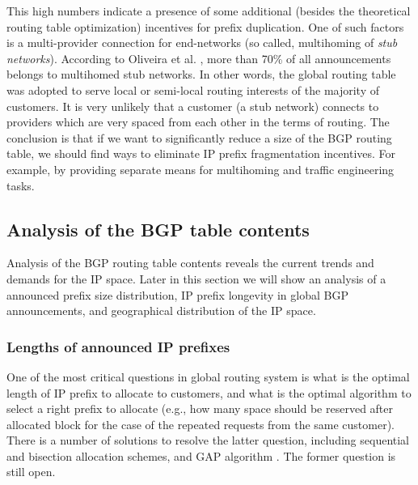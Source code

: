 This high numbers indicate a presence of some additional (besides the
theoretical routing table optimization) incentives for prefix duplication. One
of such factors is a multi-provider connection for end-networks (so called,
multihoming of \emph{stub networks}). According to Oliveira et al.
\cite{Oliveira:2007:Observing-the-evolution}, more than 70\% of all
announcements belongs to multihomed stub networks. In other words, the global
routing table was adopted to serve local or semi-local routing interests of
the majority of customers. It is very unlikely that a customer (a stub
network) connects to providers which are very spaced from each other in the
terms of routing. The conclusion is that if we want to significantly reduce a
size of the BGP routing table, we should find ways to eliminate IP prefix
fragmentation incentives. For example, by providing separate means for
multihoming and traffic engineering tasks.

\subsection{Analysis of the BGP table contents}

Analysis of the BGP routing table contents reveals the current trends and
demands for the IP space. Later in this section we will show an analysis of a
announced prefix size distribution, IP prefix longevity in global BGP
announcements, and geographical distribution of the IP space.

\subsubsection{Lengths of announced IP prefixes}

One of the most critical questions in global routing system is what is the
optimal length of IP prefix to allocate to customers, and what is the optimal
algorithm to select a right prefix to allocate (e.g., how many space should be
reserved after allocated block for the case of the repeated requests from the
same customer). There is a number of solutions to resolve the latter question,
including sequential and bisection allocation schemes, and GAP algorithm
\cite{Wang:2007:Reduce-IP-Address}. The former question is still open.


